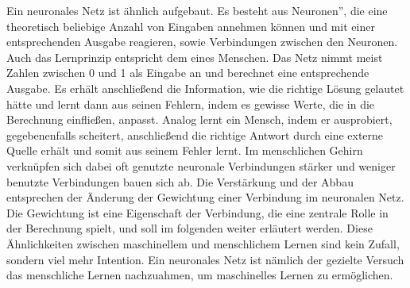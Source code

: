 \documentclass[11pt]{article}
\begin{document}
Ein neuronales Netz ist ähnlich aufgebaut. Es besteht aus \glqq Neuronen'', die eine theoretisch beliebige Anzahl von Eingaben annehmen können und mit einer entsprechenden Ausgabe reagieren, sowie Verbindungen zwischen den Neuronen. Auch das Lernprinzip entspricht dem eines Menschen. Das Netz nimmt meist Zahlen zwischen 0 und 1 als Eingabe an und berechnet eine entsprechende Ausgabe. Es erhält anschließend die Information, wie die richtige Lösung gelautet hätte und lernt dann aus seinen Fehlern, indem es gewisse Werte, die in die Berechnung einfließen, anpasst. Analog lernt ein Mensch, indem er ausprobiert, gegebenenfalls scheitert, anschließend die richtige Antwort durch eine externe Quelle erhält und somit aus seinem Fehler lernt. Im menschlichen Gehirn verknüpfen sich dabei oft genutzte neuronale Verbindungen stärker und weniger benutzte Verbindungen bauen sich ab\cite{2}. Die Verstärkung und der Abbau entsprechen der Änderung der Gewichtung einer Verbindung im neuronalen Netz. Die Gewichtung ist eine Eigenschaft der Verbindung, die eine zentrale Rolle in der Berechnung spielt, und soll im folgenden weiter erläutert werden. Diese Ähnlichkeiten zwischen maschinellem und menschlichem Lernen sind kein Zufall, sondern viel mehr Intention. Ein neuronales Netz ist nämlich der gezielte Versuch das menschliche Lernen nachzuahmen, um maschinelles Lernen zu ermöglichen.
\end{document}
